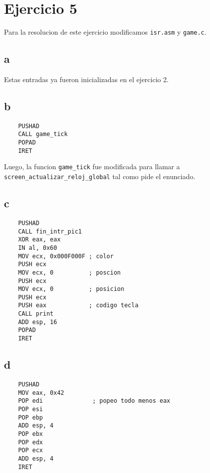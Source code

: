 \section{Ejercicio 5}

Para la resolucion de este ejercicio modificamos \texttt{isr.asm} y \texttt{game.c}.

\subsection{a}

Estas entradas ya fueron inicializadas en el ejercicio 2.

\subsection{b}

\begin{lstlisting}
	PUSHAD
	CALL game_tick
	POPAD
	IRET
\end{lstlisting}

Luego, la funcion \texttt{game\_tick} fue modificada para llamar a \texttt{screen\_actualizar\_reloj\_global} tal como pide el enunciado.

\subsection{c}

\begin{lstlisting}
	PUSHAD
	CALL fin_intr_pic1
	XOR eax, eax
	IN al, 0x60
	MOV ecx, 0x000F000F ; color
	PUSH ecx
	MOV ecx, 0          ; poscion
	PUSH ecx
	MOV ecx, 0          ; posicion
	PUSH ecx
	PUSH eax            ; codigo tecla
	CALL print
	ADD esp, 16
	POPAD
	IRET
\end{lstlisting}

\subsection{d}

\begin{lstlisting}
	PUSHAD
	MOV eax, 0x42
	POP edi              ; popeo todo menos eax
	POP esi
	POP ebp
	ADD esp, 4
	POP ebx
	POP edx
	POP ecx
	ADD esp, 4
	IRET
\end{lstlisting}